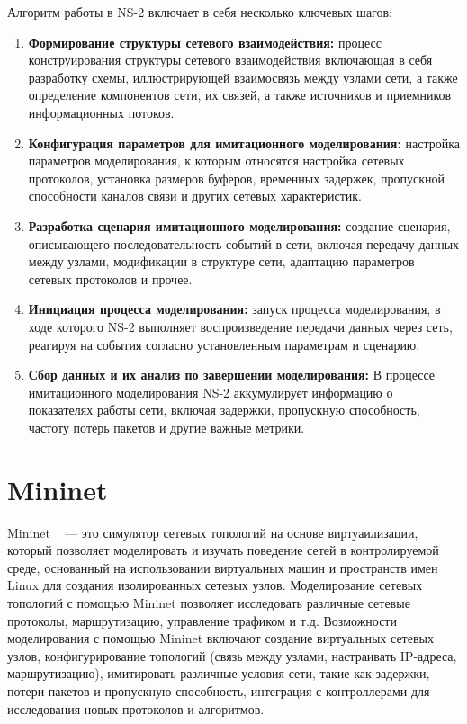 Алгоритм работы в NS-2 включает в себя несколько ключевых шагов:
\begin{enumerate}
\item \textbf{Формирование структуры сетевого взаимодействия:} процесс конструирования структуры сетевого взаимодействия включающая в себя разработку схемы, 
иллюстрирующей взаимосвязь между узлами сети, а также определение компонентов сети, их связей, а также источников и приемников информационных потоков.
\item \textbf{Конфигурация параметров для имитационного моделирования:} настройка параметров моделирования, к которым относятся настройка сетевых протоколов, 
установка размеров буферов, временных задержек, пропускной способности каналов связи и других сетевых характеристик.
\item \textbf{Разработка сценария имитационного моделирования:} создание сценария, описывающего последовательность событий в сети, включая передачу данных между узлами, 
модификации в структуре сети, адаптацию параметров сетевых протоколов и прочее.
\item \textbf{Инициация процесса моделирования:} запуск процесса моделирования, в ходе которого NS-2 выполняет воспроизведение передачи данных через сеть, реагируя на 
события согласно установленным параметрам и сценарию.
\item \textbf{Сбор данных и их анализ по завершении моделирования:} В процессе имитационного моделирования NS-2 аккумулирует информацию о показателях работы сети, 
включая задержки, пропускную способность, частоту потерь пакетов и другие важные метрики.
\end{enumerate}

\section{Mininet}
\label{chap1:sec2}

Mininet ~\cite{mininet} — это симулятор сетевых топологий на основе виртуаилизации,
который позволяет моделировать и изучать поведение сетей в
контролируемой среде, основанный на использовании виртуальных машин и
пространств имен Linux для создания изолированных сетевых
узлов. Моделирование сетевых топологий с помощью Mininet позволяет
исследовать различные сетевые протоколы, маршрутизацию, управление
трафиком и т.д. Возможности моделирования с помощью Mininet включают
создание виртуальных сетевых узлов, конфигурирование топологий (связь
между узлами, настраивать IP-адреса, маршрутизацию), имитировать
различные условия сети, такие как задержки, потери пакетов и
пропускную способность, интеграция с контроллерами для исследования
новых протоколов и алгоритмов. 



